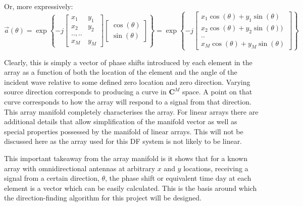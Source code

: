 Or, more expressively:
\begin{equation}
\vec{a}(\theta) = \exp \left\{ -j \begin{bmatrix} x_1 & y_1 \\ x_2 & y_2 \\ .., .. \\ x_M & y_M \end{bmatrix} \begin{bmatrix} \cos(\theta) \\ \sin(\theta) \end{bmatrix} \right\}
= \exp \left\{ -j \begin{bmatrix} x_1\cos(\theta) + y_1\sin(\theta) \\ x_2\cos(\theta) + y_2\sin(\theta)) \\ .. \\ x_M\cos(\theta) + y_M\sin(\theta) \end{bmatrix} \right\}
\end{equation}

Clearly, this is simply a vector of phase shifts introduced by each element in the array as a function of both the location of the element and the angle of the incident wave relative to some defined zero location and zero direction. 
Varying source direction corresponds to producing a curve in \(\mathbf{C}^M\) space. 
A point on that curve corresponds to how the array will respond to a signal from that direction.
This array manifold completely characterises the array\cite{dacos1995estimating}. 
For linear arrays there are additional details that allow simplification of the manifold vector as well as special properties possessed by the manifold of linear arrays.
This will not be discussed here as the array used for this DF system is not likely to be linear. 

This important takeaway from the array manifold is it shows that for a known array with omnidirectional antennas at arbitrary \(x\) and \(y\) locations, receiving a signal from a certain direction, \(\theta\), the phase shift or equivalent time day at each element is a vector which can be easily calculated. This is the basis around which the direction-finding algorithm for this project will be designed. 
